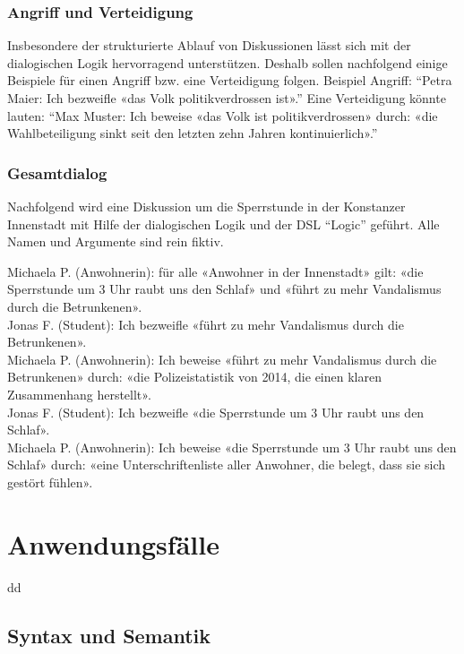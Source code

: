 \documentclass[11pt,a4paper,bibtotocnumbered]{scrreprt}
\begin{document}
\subsection{Angriff und Verteidigung}

Insbesondere der strukturierte Ablauf von Diskussionen lässt sich mit der dialogischen Logik hervorragend unterstützen. Deshalb sollen nachfolgend einige Beispiele für einen Angriff bzw. eine Verteidigung folgen.
Beispiel Angriff: \enquote{Petra Maier: Ich bezweifle «das Volk politikverdrossen ist».}
Eine Verteidigung könnte lauten: \enquote{Max Muster: Ich beweise «das Volk ist politikverdrossen» durch: «die Wahlbeteiligung sinkt seit den letzten zehn Jahren kontinuierlich».}

\subsection{Gesamtdialog}

Nachfolgend wird eine Diskussion um die Sperrstunde in der Konstanzer Innenstadt mit Hilfe der dialogischen Logik und der DSL \enquote{Logic} geführt. 
Alle Namen und Argumente sind rein fiktiv.

Michaela P. (Anwohnerin): für alle «Anwohner in der Innenstadt» gilt: «die Sperrstunde um 3 Uhr raubt uns den Schlaf» und «führt zu mehr Vandalismus durch die Betrunkenen».\\
Jonas F. (Student): Ich bezweifle «führt zu mehr Vandalismus durch die Betrunkenen».\\
Michaela P. (Anwohnerin): Ich beweise «führt zu mehr Vandalismus durch die Betrunkenen» durch: «die Polizeistatistik von 2014, die einen klaren Zusammenhang herstellt». \\
Jonas F. (Student): Ich bezweifle «die Sperrstunde um 3 Uhr raubt uns den Schlaf».\\
Michaela P. (Anwohnerin): Ich beweise «die Sperrstunde um 3 Uhr raubt uns den Schlaf» durch: «eine Unterschriftenliste aller Anwohner, die belegt, dass sie sich gestört fühlen».

\chapter{Anwendungsfälle} %

dd

\section{Syntax und Semantik} %
\end{document}
